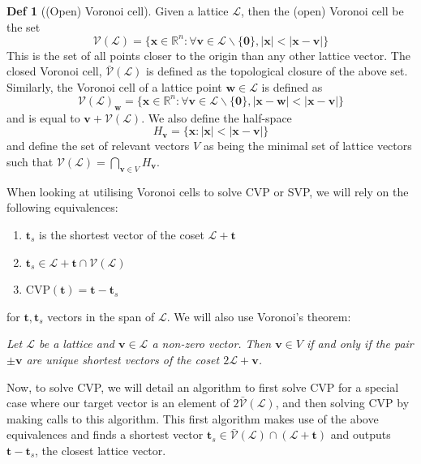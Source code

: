 \documentclass[a4paper, 10pt]{article}
\theoremstyle{definition}
\newtheorem{definition}{Def}[section]
\begin{document}
\begin{definition}[(Open) Voronoi cell]
    Given a lattice $\mathcal{L}$, then the (open) Voronoi cell be the set
    \[\mathcal{V}(\mathcal{L}) = \{\mathbf{x} \in \mathbb{R}^n : \forall \mathbf{v} \in \mathcal{L} \backslash \{\mathbf{0}\}, |\mathbf{x}| < |\mathbf{x} - \mathbf{v}|\}\]
    This is the set of all points closer to the origin than any other lattice vector. The closed Voronoi cell, $\bar{\mathcal{V}}(\mathcal{L})$ is defined as the topological closure of the above set. Similarly, the Voronoi cell of a lattice point $\mathbf{w} \in \mathcal{L}$ is defined as
    \[\mathcal{V}(\mathcal{L})_{\mathbf{w}} = \{\mathbf{x} \in \mathbb{R}^n : \forall \mathbf{v} \in \mathcal{L} \backslash \{\mathbf{0}\}, |\mathbf{x} - \mathbf{w}| < |\mathbf{x} - \mathbf{v}|\}\]
    and is equal to $\mathbf{v}+\mathcal{V}(\mathcal{L})$. We also define the half-space
    \[H_{\mathbf{v}} = \{\mathbf{x} : |\mathbf{x}| < |\mathbf{x} - \mathbf{v}|\}\]
    and define the set of relevant vectors $V$ as being the minimal set of lattice vectors such that $\mathcal{V}(\mathcal{L}) = \bigcap _{\mathbf{v}\in V}H_{\mathbf{v}}$.
\end{definition}
When looking at utilising Voronoi cells to solve \ac{CVP} or \ac{SVP}, we will rely on the following equivalences:
\begin{enumerate}
    \item $\mathbf{t}_s$ is the shortest vector of the coset $\mathcal{L} + \mathbf{t}$
    \item $\mathbf{t}_s \in \mathcal{L} + \mathbf{t}\cap \mathcal{V}(\mathcal{L})$
    \item \ac{CVP}$(\mathbf{t}) = \mathbf{t} - \mathbf{t}_s$
\end{enumerate}
    
for $\mathbf{t}, \mathbf{t}_s$ vectors in the span of $\mathcal{L}$. We will also use Voronoi's theorem:

\textit{Let $\mathcal{L}$ be a lattice and $\mathbf{v}\in \mathcal{L}$ a non-zero vector. Then $\mathbf{v} \in V$ if and only if the pair $\pm \mathbf{v}$ are unique shortest vectors of the coset $2\mathcal{L} + \mathbf{v}$.}

Now, to solve \ac{CVP}, we will detail an algorithm to first solve \ac{CVP} for a special case where our target vector is an element of $2\bar{\mathcal{V}}(\mathcal{L})$, and then solving \ac{CVP} by making calls to this algorithm. This first algorithm makes use of the above equivalences and finds a shortest vector $\mathbf{t}_s \in \bar{\mathcal{V}}(\mathcal{L})\cap (\mathcal{L} + \mathbf{t})$ and outputs $\mathbf{t} - \mathbf{t}_s$, the closest lattice vector.
\end{document}
